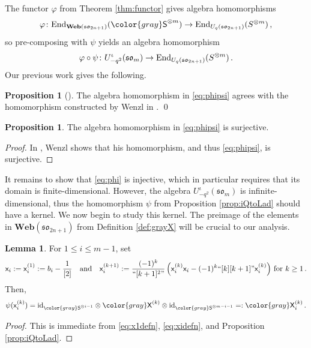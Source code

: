 \documentclass[10pt]{amsart}
\newcommand{\gray}[1]{{\color{gray}#1}}
\numberwithin{equation}{section}
\theoremstyle{definition}
\newtheorem{lem}[thm]{Lemma}
\newtheorem{prop}[thm]{Proposition}
\newcommand{\End}{{\rm End}}
\renewcommand{\to}{\rightarrow}
\newcommand{\id}{{\rm id}}
\newcommand{\son}[1][2n+1]{\mathfrak{so}_{#1}}
\newcommand{\som}[1][m]{\mathfrak{so}_{#1}}
\newcommand{\Web}{\mathbf{Web}}
\newcommand{\iqUsom}[1][m]{{U}^{\iota}_{-q^2}(\som[#1])}
\newcommand{\xx}{\gray{\mathsf{X}}}
\newcommand{\xxb}{\mathsf{x}}
\newcommand{\gS}{\gray{\mathsf{S}}}
\begin{document}
The functor $\varphi$ from Theorem \ref{thm:functor} 
gives algebra homomorphisms 
\begin{equation}\label{eq:phi}
\varphi \colon
\End_{\Web(\son)}(\gS^{\otimes m}) \rightarrow \End_{U_q(\son)}(S^{\otimes m}) \, ,
	\end{equation}
so pre-composing with $\psi$ yields an algebra homomorphism
\begin{equation}\label{eq:phipsi}
\varphi \circ \psi \colon \iqUsom \to \End_{U_q(\son)}(S^{\otimes m}) \, .
	\end{equation}
Our previous work gives the following.

\begin{prop}[{\cite[Proposition B.10]{BER}}]\label{prop:phipsi-isWenzl}
The algebra homomorphism in \eqref{eq:phipsi}
agrees with the homomorphism constructed by Wenzl in \cite{Wenzl-Spin}. \qed
\end{prop}

\begin{prop}\label{prop:alg-hom-surj}
The algebra homomorphism in \eqref{eq:phipsi} is surjective.
\end{prop}

\begin{proof}
In \cite[Theorem 5.3]{Wenzl-Spin}, Wenzl shows that his homomorphism, 
and thus \eqref{eq:phipsi}, is surjective.
\end{proof}

It remains to show that \eqref{eq:phi} is injective, 
which in particular requires that its domain is finite-dimensional.
However, the algebra $\iqUsom$ is infinite-dimensional, 
thus the homomorphism $\psi$ from Proposition \ref{prop:iQtoLad} should have a kernel. 
We now begin to study this kernel.
The preimage of the elements in $\Web(\son)$ from Definition \ref{def:grayX} will be crucial to 
our analysis.

\begin{lem}\label{lem:xpsiX}
For $1 \leq i \leq m-1$, set
\begin{equation}\label{eq:blackx}
\xxb_i := \xxb_i^{(1)} := b_i - \frac{1}{[2]}
\quad \text{and} \quad
\xxb_i^{(k+1)} := \dfrac{(-1)^k}{``[k+1]^2"}\left(\xxb_i^{(k)} \xxb_i - (-1)^{k} ``[k][k+1]"\xxb_i^{(k)}\right)
\, \text{for } k \geq 1 \, .
	\end{equation}
Then, 
\begin{equation}\label{eq:xpsiX}
\psi(\xxb_i^{(k)}) 
= \id_{\gS^{\otimes i-1}} \otimes \xx^{(k)} \otimes \id_{\gS^{\otimes m-i-1}}
=: \xx_i^{(k)} \, .
\end{equation}
	\end{lem}
\begin{proof}
This is immediate from \eqref{eq:x1defn}, \eqref{eq:xidefn}, 
and Proposition \ref{prop:iQtoLad}.
\end{proof}
\end{document}
